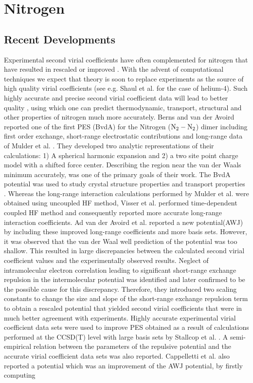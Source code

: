\chapter{Nitrogen}
\label{chap:n2}
\SCBtrue
\section{Recent Developments}
    Experimental second virial coefficients have often complemented \abinitio{} \PESs{} for nitrogen that have resulted in rescaled or improved \PESs{}. With the advent of computational techniques we expect that theory is soon to replace experiments as the source of high quality virial coefficients (see e.g. Shaul et al. \cite{Shaul2012SC} for the case of helium-4). Such highly accurate and precise second virial coefficient data will lead to better quality \PESs{}, using which one can predict thermodynamic, transport, structural and other properties of nitrogen much more accurately. Berns and van der Avoird \cite{Berns1980} reported one of the first \abinitio{} PES (BvdA) for the Nitrogen (${\rm N_2 - N_2}$) dimer including first order exchange, short-range electrostatic contributions and long-range data of Mulder et al. \cite{Mulder1980}. They developed two analytic representations of their calculations: 1) A spherical harmonic expansion and 2) a two site point charge model with a shifted force center. Describing the region near the van der Waals minimum accurately, was one of the primary goals of their work. The BvdA potential was used to study crystal structure properties \cite{Luty1980} and transport properties \cite{Nyeland1984}. Whereas the long-range interaction calculations performed by Mulder et al. \cite{Mulder1980} were obtained using uncoupled HF method, Visser et al. \cite{Visser1983} performed time-dependent coupled HF method and consequently reported more accurate long-range interaction coefficients. Ad van der Avoird et al. \cite{vanDerAvoird1986} reported a new potential(AWJ) by including these improved long-range coefficients and more basis sets. However, it was observed that the van der Waal well prediction of the potential was too shallow. This resulted in large discrepancies between the calculated second virial coefficient values and the experimentally observed results. Neglect of intramolecular electron correlation leading to significant short-range exchange repulsion in the intermolecular potential was identified and later confirmed to be the possible cause for this discrepancy. Therefore, they introduced two scaling constants to change the size and slope of the short-range exchange repulsion term to obtain a rescaled potential that yielded second virial coefficients that were in much better agreement with experiments. Highly accurate experimental virial coefficient data sets were used to improve \abinitio{} PES obtained as a result of calculations performed at the CCSD(T) level with large basis sets by Stallcop et al. \cite{Stallcop1997}. A semi-empirical relation between the parameters of the repulsive potential and the accurate virial coefficient data sets was also reported. Cappelletti et al. \cite{Cappelletti1998} also reported a potential which was an improvement of the AWJ potential, by firstly computing 